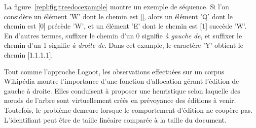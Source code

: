 \begin{itemize}
  La figure~\ref{repl:fig:treedocexample} montre un exemple de séquence. Si l'on
  considère un élément 'W' dont le chemin est [], alors un élément 'Q' dont le
  chemin est [0] précède 'W', et un élément 'E' dont le chemin est [1] succède
  'W'. En d'autres termes, suffixer le chemin d'un 0 signifie \emph{à gauche
    de}, et suffixer le chemin d'un 1 signifie \emph{à droite de}. Dans cet
  example, le caractère 'Y' obtient le chemin [1.1.1.1].
  
  Tout comme l'approche Logoot, les observations effectuées sur un
  corpus Wikipédia montre l'importance d'une fonction d'allocation gérant
  l'édition de gauche à droite. Elles conduisent à proposer une heuristique
  selon laquelle des nœuds de l'arbre sont virtuellement créés en prévoyance des
  éditions à venir. Toutefois, le problème demeure lorsque le comportement
  d'édition ne coopère pas. L'identifiant peut être de taille linéaire comparée
  à la taille du document.
\end{itemize}


